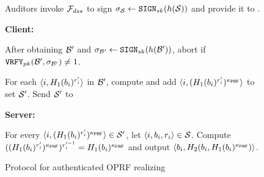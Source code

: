\begin{figure}[h]
{\begin{minipage}[t]{\textwidth}
\item Auditors invoke $\mathcal{F}_{dss}$ to sign $\genericSig[\genericSetVar] \assign \sign[\privKey](\hashFn(\genericSetVar))$ and provide it to \server. 




\enumListEnd

\smallskip\noindent\textbf{Client:}

\enumListStartResume
\item\label{authOPRF:client:verify_sigs}  After obtaining $\blocklist'$ and $\genericSig[\blocklist'] \assign \sign[\privKey](\hashFn(\blocklist'))$, abort if $\verify[\pubKey](\blocklist', \genericSig[\blocklist']) \neq 1$.

\item\label{authOPRF:client:prf} For each $\langle \setIdx, \oprfRO[1](\genericBlocklistElmt[\setIdx])^{\genericRand[\setIdx]'} \rangle$ in $\blocklist'$, compute and add $\langle \setIdx,  (\oprfRO[1](\genericBlocklistElmt[\setIdx])^{\genericRand[\setIdx]'})^{\prfKey} \rangle$ to set $\genericSetVar'$. Send $\genericSetVar'$ to \server

\enumListEnd

\smallskip\noindent\textbf{Server:}

\enumListStartResume
\item\label{authOPRF:serverdeblind} For every $\langle \setIdx,  (\oprfRO[1](\genericBlocklistElmt[\setIdx])^{\genericRand[\setIdx]'})^{\prfKey} \rangle \in \genericSetVar'$, let  $\langle \setIdx, \genericBlocklistElmt[\setIdx], \genericRand[\setIdx] \rangle \in \genericSetVar$. Compute $((\oprfRO[1](\genericBlocklistElmt[\setIdx])^{\genericRand[\setIdx]'})^{\prfKey})^{\genericRand[\setIdx]'^{-1}} = \oprfRO[1](\genericBlocklistElmt[\setIdx])^{\prfKey}$ and output $\langle \genericBlocklistElmt[\setIdx], \oprfRO[2](\genericBlocklistElmt[\setIdx], \oprfRO[1](\genericBlocklistElmt[\setIdx])^{\prfKey}) \rangle$. 

\enumListEnd
\end{minipage}
}
\caption{Protocol for authenticated OPRF realizing \authOPRFFunc \label{fig:authOPRF}}
\end{figure}
